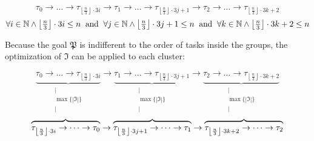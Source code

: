 \begin{center}\vspace{-5mm} \[
		\tau_0 \rightarrow \dots \rightarrow \tau_{\left\lfloor\frac{n}{3} \right\rfloor \cdot 3i} \rightarrow
		\tau_1 \rightarrow \dots \rightarrow \tau_{\left\lfloor\frac{n}{3} \right\rfloor \cdot 3j + 1} \rightarrow
		\tau_2 \rightarrow \dots \rightarrow \tau_{\left\lfloor\frac{n}{3} \right\rfloor \cdot 3k + 2} \] \[
		\forall i \in \mathbb{N} \wedge \left\lfloor\textstyle\frac{n}{3} \right\rfloor \cdot 3i \leq n \text{\hspace{0.2cm}and\hspace{0.2cm}}
		\forall j \in \mathbb{N} \wedge \left\lfloor\textstyle\frac{n}{3} \right\rfloor \cdot 3j + 1 \leq n \text{\hspace{0.2cm}and\hspace{0.2cm}}
		\forall k \in \mathbb{N} \wedge \left\lfloor\textstyle\frac{n}{3} \right\rfloor \cdot 3k + 2 \leq n \]
\end{center}

Because the goal \(\mathfrak{P}\) is indifferent to the order of tasks inside the groups, the optimization of \(\mathfrak{I}\) can be applied to each cluster:
\begin{center}\vspace{-5mm} \[
		\underbrace{\tau_0 \rightarrow \dots \rightarrow \tau_{\left\lfloor\frac{n}{3} \right\rfloor \cdot 3i    }}_{\begin{array}{c}|\\\max\{|\mathfrak{I}|\}\\|\end{array}} \rightarrow
		\underbrace{\tau_1 \rightarrow \dots \rightarrow \tau_{\left\lfloor\frac{n}{3} \right\rfloor \cdot 3j + 1}}_{\begin{array}{c}|\\\max\{|\mathfrak{I}|\}\\|\end{array}} \rightarrow
		\underbrace{\tau_2 \rightarrow \dots \rightarrow \tau_{\left\lfloor\frac{n}{3} \right\rfloor \cdot 3k + 2}}_{\begin{array}{c}|\\\max\{|\mathfrak{I}|\}\\|\end{array}}
	\]\vspace{-3mm}\[
		\overbrace{\vphantom{I}\tau_{\left\lfloor\frac{n}{3} \right\rfloor \cdot 3i    } \rightarrow \dots \rightarrow \tau_0} \rightarrow
		\overbrace{\vphantom{I}\tau_{\left\lfloor\frac{n}{3} \right\rfloor \cdot 3j + 1} \rightarrow \dots \rightarrow \tau_1} \rightarrow
		\overbrace{\vphantom{I}\tau_{\left\lfloor\frac{n}{3} \right\rfloor \cdot 3k + 2} \rightarrow \dots \rightarrow \tau_2} \]
\end{center}



